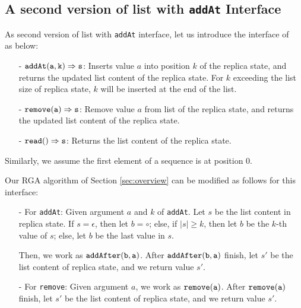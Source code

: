 \subsection{A second version of list with {\tt addAt} Interface}
\label{subsec:a second version of list with addAt interface} 

As second version of list with {\tt addAt} interface, let us introduce the interface of ~\cite{AttiyaBGMYZ16} as below: 

\begin{itemize}
\setlength{\itemsep}{0.5pt}
\item[-] $\alabellong[{\tt addAt}]{a,k}{s}{}$: Inserts value $a$ into position $k$ of the replica state, and returns the updated list content of the replica state. For $k$ exceeding the list size of replica state, $k$ will be inserted at the end of the list. 

\item[-] $\alabellong[{\tt remove}]{a}{s}{}$: Remove value $a$ from list of the replica state, and returns the updated list content of the replica state.

\item[-] $\alabellong[{\tt read}]{}{s}{}$: Returns the list content of the replica state.
\end{itemize} 

Similarly, we assume the first element of a sequence is at position $0$.

Our RGA algorithm of Section \ref{sec:overview} can be modified as follows for this interface: 

\begin{itemize}
\setlength{\itemsep}{0.5pt}
\item[-] For {\tt addAt}: Given argument $a$ and $k$ of {\tt addAt}. Let $s$ be the list content in replica state. If $s = \epsilon$, then let $b = \circ$; else, if $\vert s \vert \geq k$, then let $b$ be the $k$-th value of $s$; else, let $b$ be the last value in $s$. 
    
    Then, we work as $\alabelshort[{\tt addAfter}]{b,a}$. After $\alabelshort[{\tt addAfter}]{b,a}$ finish, let $s'$ be the list content of replica state, and we return value $s'$.

\item[-] For {\tt remove}: Given argument $a$, we work as $\alabelshort[{\tt remove}]{a}$. After $\alabelshort[{\tt remove}]{a}$ finish, let $s'$ be the list content of replica state, and we return value $s'$. 
\end{itemize} 




